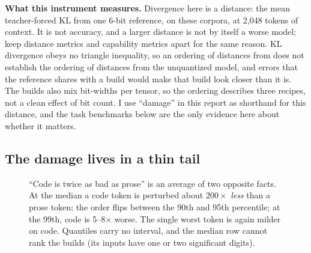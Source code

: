 \textbf{What this instrument measures.} Divergence here is a distance: the mean teacher-forced KL from
one 6-bit reference, on these corpora, at 2{,}048 tokens of context. It is not accuracy, and a larger
distance is not by itself a worse model; \citet{dutta2024accuracy} keep distance metrics and capability
metrics apart for the same reason. KL divergence obeys no triangle inequality, so an ordering of
distances from \QsixXL{} does not establish the ordering of distances from the unquantized model, and
errors that the reference shares with a build would make that build look closer than it is. The builds
also mix bit-widths per tensor, so the ordering describes three recipes, not a clean effect of bit
count. I use ``damage'' in this report as shorthand for this distance, and the task benchmarks below
are the only evidence here about whether it matters.

\subsection{The damage lives in a thin tail}\label{sec:tail}

\begin{figure}[t]
\centering
{}
\caption{``Code is twice as bad as prose'' is an average of two opposite facts. At the median a code
token is perturbed about $200\times$ \emph{less} than a prose token; the order flips between the 90th
and 95th percentile; at the 99th, code is 5--8$\times$ worse. The single worst token is again milder on
code. Quantiles carry no interval, and the median row cannot rank the builds (its inputs have one or
two significant digits).}\label{fig:tail}
\end{figure}

